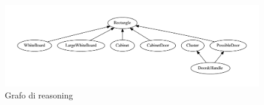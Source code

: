 \begin{figure}[ht]
  \includegraphics[width=\textwidth]{diagrammi/reasoning}
  \caption{Grafo di reasoning}
  \label{fig:grafo-reasoning}
\end{figure}
